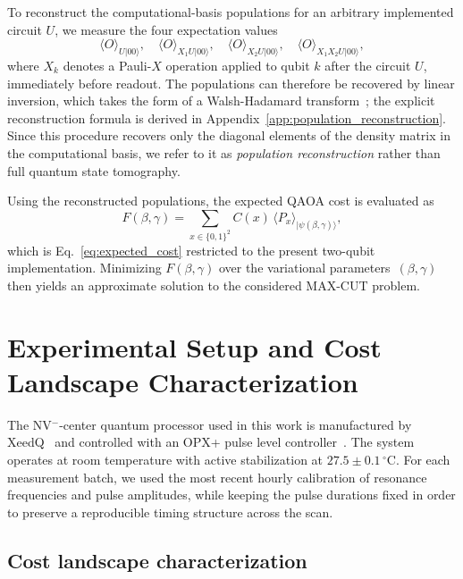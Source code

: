 \documentclass[conference]{IEEEtran}
\begin{document}
To reconstruct the computational-basis populations for an arbitrary implemented
circuit \(U\), we measure the four expectation values
\begin{equation}
    \langle O\rangle_{U|00\rangle},\quad
    \langle O\rangle_{X_1 U|00\rangle},\quad
    \langle O\rangle_{X_2 U|00\rangle},\quad
    \langle O\rangle_{X_1 X_2 U|00\rangle},
    \label{eq:four_measurements}
\end{equation}
where \(X_k\) denotes a Pauli-\(X\) operation applied to qubit \(k\) after the
circuit \(U\), immediately before readout. The populations can therefore be
recovered by linear inversion, which takes the form of a Walsh-Hadamard
transform~\cite{cooper2016coherent, nielsen2010quantum}; the explicit
reconstruction formula is derived in
Appendix~\ref{app:population_reconstruction}. Since this procedure recovers only
the diagonal elements of the density matrix in the computational basis, we refer
to it as \emph{population reconstruction} rather than full quantum state
tomography.

Using the reconstructed populations, the expected QAOA cost is evaluated as
\begin{equation}
    F(\beta,\gamma)
    = \sum_{x\in\{0,1\}^2} C(x)\,\langle P_x\rangle_{|\psi(\beta,\gamma)\rangle},
    \label{eq:expected_cost_two_qubit}
\end{equation}
which is Eq.~\eqref{eq:expected_cost} restricted to the present two-qubit
implementation. Minimizing \(F(\beta,\gamma)\) over the variational
parameters~\((\beta,\gamma)\) then yields an approximate solution to the
considered MAX-CUT problem.

\section{Experimental Setup and Cost Landscape Characterization}

The NV\(^-\)-center quantum processor used in this work is manufactured by
XeedQ~\cite{xeedq} and controlled with an OPX+ pulse level
controller~\cite{qmach_opx}. The system operates at room temperature with active
stabilization at \(27.5 \pm 0.1\,^\circ\mathrm{C}\). For each measurement batch,
we used the most recent hourly calibration of resonance frequencies and pulse
amplitudes, while keeping the pulse durations fixed in order to preserve a
reproducible timing structure across the scan.

\subsection{Cost landscape characterization}
\label{sec:cost_landscape_characterization}
\end{document}
